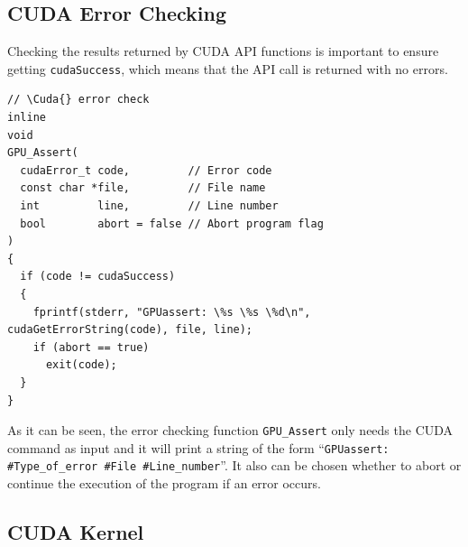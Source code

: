 \documentclass[12pt]{article}
\newcommand*{\Cuda}{\textsc{CUDA}}
\begin{document}
\subsection{\Cuda{} Error Checking}

Checking the results returned by \Cuda{} API functions is important to ensure getting \texttt{cudaSuccess}, which means that the API call is returned with no errors.

\begin{lstlisting}
// \Cuda{} error check
inline
void
GPU_Assert(
  cudaError_t code,         // Error code
  const char *file,         // File name
  int         line,         // Line number
  bool        abort = false // Abort program flag
)
{
  if (code != cudaSuccess)
  {
    fprintf(stderr, "GPUassert: \%s \%s \%d\n", cudaGetErrorString(code), file, line);
    if (abort == true)
      exit(code);
  }
}
\end{lstlisting}

As it can be seen, the error checking function \texttt{GPU\_Assert} only needs the \Cuda{} command as input and it will print a string of the form ``\texttt{GPUassert: \#Type\_of\_error \#File \#Line\_number}''. It also can be chosen whether to abort or continue the execution of the program if an error occurs.

\subsection{\Cuda{} Kernel}
\end{document}
